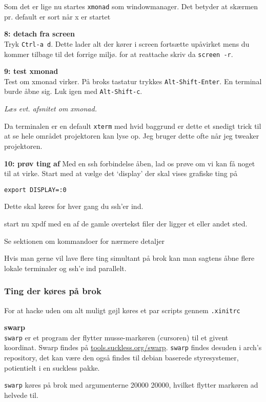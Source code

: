 \documentclass[10pt,a4paper,danish]{article}
\newcommand{\code}[1]{\colorbox{verbgray}{\texttt{#1}}}
\begin{document}
Som det er lige nu startes \texttt{xmonad} som windowmanager.
Det betyder at skærmen pr. default er sort når x er startet


\textbf{8: detach fra screen}\\
Tryk \texttt{Ctrl-a d}. Dette lader alt der kører i screen fortsætte upåvirket
mens du kommer tilbage til det forrige miljø.
for at reattache skriv da \code{screen -r}.

\textbf{9: test xmonad}\\
Test om xmonad virker. På broks tastatur trykkes \texttt{Alt-Shift-Enter}.
En terminal burde åbne sig.
Luk igen med \texttt{Alt-Shift-c}.

\textit{Læs evt. afsnitet om xmonad.}

Da terminalen er en default \texttt{xterm} med hvid baggrund er dette et snedigt trick
til at se hele området projektoren kan lyse op.
Jeg bruger dette ofte når jeg tweaker projektoren.



\textbf{10: prøv ting af}
Med en ssh forbindelse åben, lad os prøve om vi kan få noget til at virke.
Start med at vælge det `display' der skal vises grafiske ting på
\begin{verbatim}
export DISPLAY=:0
\end{verbatim}
Dette skal køres for hver gang du ssh'er ind.

start nu xpdf med en af de gamle overtekst filer der ligger et eller andet sted.

Se sektionen om kommandoer for nærmere detaljer

Hvis man gerne vil lave flere ting simultant på brok kan man sagtens åbne flere
lokale terminaler og ssh'e ind parallelt.




\subsubsection{Ting der køres på brok}
For at hacke uden om alt muligt gøjl køres et par scripts gennem
\texttt{.xinitrc}

\textbf{swarp}\\
\texttt{swarp} er et program der flytter musse-markøren (cursoren) til et givent koordinat.
Swarp findes på \url{tools.suckless.org/swarp}.
\texttt{swarp} findes desuden i arch's repository, det kan være den også findes til
debian baserede styresystemer, potientielt i en suckless pakke.

\texttt{swarp} køres på brok med argumenterne 20000 20000, hvilket flytter
markøren ad helvede til.
\end{document}
